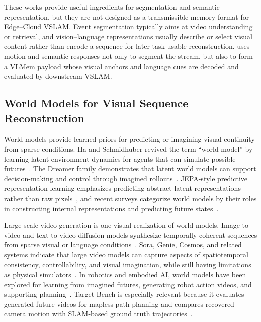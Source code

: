 These works provide useful ingredients for segmentation and semantic representation, but they are not designed as a transmissible memory format for Edge--Cloud VSLAM. Event segmentation typically aims at video understanding or retrieval, and vision--language representations usually describe or select visual content rather than encode a sequence for later task-usable reconstruction. \VLMemCodec{} uses motion and semantic responses not only to segment the stream, but also to form a VLMem payload whose visual anchors and language cues are decoded and evaluated by downstream VSLAM.

\subsection{World Models for Visual Sequence Reconstruction}
\label{subsec:world_model_decoding}

World models provide learned priors for predicting or imagining visual continuity from sparse conditions. Ha and Schmidhuber revived the term ``world model'' by learning latent environment dynamics for agents that can simulate possible futures~\cite{ha2018worldmodels}. The Dreamer family demonstrates that latent world models can support decision-making and control through imagined rollouts~\cite{hafner2019planet,hafner2020dreamer,hafner2023dreamerv3}. JEPA-style predictive representation learning emphasizes predicting abstract latent representations rather than raw pixels~\cite{lecun2022path,assran2024vjepa}, and recent surveys categorize world models by their roles in constructing internal representations and predicting future states~\cite{ding2025worldmodelsurvey}.

Large-scale video generation is one visual realization of world models. Image-to-video and text-to-video diffusion models synthesize temporally coherent sequences from sparse visual or language conditions~\cite{blattmann2023svd,ho2022videodiffusion,villegas2022phenaki}. Sora, Genie, Cosmos, and related systems indicate that large video models can capture aspects of spatiotemporal consistency, controllability, and visual imagination, while still having limitations as physical simulators~\cite{brooks2024sora,bruce2024genie,nvidia2025cosmos}. In robotics and embodied AI, world models have been explored for learning from imagined futures, generating robot action videos, and supporting planning~\cite{yang2023unipi,du2023learning,wu2023daydreamer}. Target-Bench is especially relevant because it evaluates generated future videos for mapless path planning and compares recovered camera motion with SLAM-based ground truth trajectories~\cite{wang2025targetbench}.

